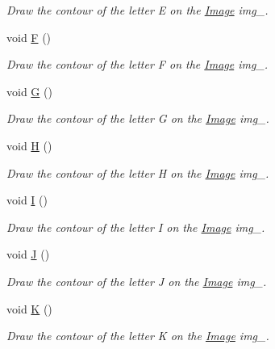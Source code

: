 \begin{DoxyCompactItemize}
\begin{DoxyCompactList}\small\item\em Draw the contour of the letter E on the \mbox{\hyperlink{class_image}{Image}} img\+\_\+. \end{DoxyCompactList}\item 
void \mbox{\hyperlink{class_font_v1_a40dd925bee9092d13ba1a00546cc7160}{F}} ()
\begin{DoxyCompactList}\small\item\em Draw the contour of the letter F on the \mbox{\hyperlink{class_image}{Image}} img\+\_\+. \end{DoxyCompactList}\item 
void \mbox{\hyperlink{class_font_v1_a9806041ba05556826ba6b4a0760fcee4}{G}} ()
\begin{DoxyCompactList}\small\item\em Draw the contour of the letter G on the \mbox{\hyperlink{class_image}{Image}} img\+\_\+. \end{DoxyCompactList}\item 
void \mbox{\hyperlink{class_font_v1_aac6c3d7f8116c21fd9339d07aa63a797}{H}} ()
\begin{DoxyCompactList}\small\item\em Draw the contour of the letter H on the \mbox{\hyperlink{class_image}{Image}} img\+\_\+. \end{DoxyCompactList}\item 
void \mbox{\hyperlink{class_font_v1_aab86d5ae867a26e0384c919f82f0bcf1}{I}} ()
\begin{DoxyCompactList}\small\item\em Draw the contour of the letter I on the \mbox{\hyperlink{class_image}{Image}} img\+\_\+. \end{DoxyCompactList}\item 
void \mbox{\hyperlink{class_font_v1_a3fe315f13fd21c6dbd5f81113cd1c3f6}{J}} ()
\begin{DoxyCompactList}\small\item\em Draw the contour of the letter J on the \mbox{\hyperlink{class_image}{Image}} img\+\_\+. \end{DoxyCompactList}\item 
void \mbox{\hyperlink{class_font_v1_a45ed7d1ac12bd32f458b5b144dd132ba}{K}} ()
\begin{DoxyCompactList}\small\item\em Draw the contour of the letter K on the \mbox{\hyperlink{class_image}{Image}} img\+\_\+. \end{DoxyCompactList}\item 

\end{DoxyCompactItemize}
